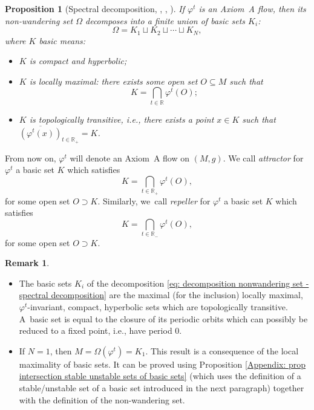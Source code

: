 \documentclass[11pt]{article}
\newcommand{\ie}{i.e.,\xspace}
\newcommand{\skpt}{\smallskip}
\theoremstyle{definition}
\newtheorem{remark}[definition]{Remark}
\theoremstyle{plain}
\newtheorem{prop}[definition]{Proposition}
\newcommand{\R}{\mathbb{R}}
\begin{document}
\begin{prop}[{Spectral decomposition, \cite[\S II.5]{smale}, \cite{bowen2}, \cite[Th.\,5.3.37]{FH}}]
If $\varphi^t$ is an Axiom~A flow, then its non-wandering set $\Omega$ decomposes into a finite union of \emph{basic} sets $K_i$:\vspace*{-3pt}
\begin{equation}\label{eq: decomposition nonwandering set - spectral decomposition}
\Omega = K_1 \sqcup K_2 \sqcup \cdots \sqcup K_N,
\end{equation}
where $K$ basic means:
\begin{itemize}
\item $K$ is compact and hyperbolic;
\item $K$ is locally maximal: there exists some open set $O\subseteq M$ such that\vspace*{-3pt}
\[
K = \bigcap_{t \in \R} \varphi^t (O);
\]
\item $K$ is topologically transitive, \ie there exists a point $x \in K$ such that \\$\overline{(\varphi^t(x))}_{t \in \R_+} = K$.
\end{itemize}
\end{prop}

From now on, $\varphi^t$ will denote an Axiom~A flow on $(M,g)$. We call \textit{attractor} for $\varphi^t$ a basic set $K$ which satisfies\vspace*{-3pt}
\[
K = \bigcap_{t \in \R_+} \varphi^t (O),
\]
for some open set $O \supset K$. Similarly, we~call \textit{repeller} for $\varphi^t$ a basic set $K$ which satisfies\vspace*{-3pt}
\[
K = \bigcap_{t \in \R_-} \varphi^t (O),
\]
for some open set $O \supset K$.

\skpt
\begin{remark}\label{rk: fixed point isolated}
\begin{itemize}
\item The basic sets $K_i$ of the decomposition \eqref{eq: decomposition nonwandering set - spectral decomposition} are the maximal (for the inclusion) locally maximal, $\varphi^t$-invariant, compact, hyperbolic sets which are topologically transitive. A~basic set is equal to the closure of its periodic orbits which can possibly be reduced to a fixed point, \ie have period $0$.
\item If $N = 1$, then $M = \Omega (\varphi^t) = K_1$. This result is a consequence of the local maximality of basic sets. It can be proved using Proposition \ref{Appendix: prop intersection stable unstable sets of basic sets} (which uses the definition of a stable/unstable set of a basic set introduced in the next paragraph) together with the definition of the non-wandering set.
\end{itemize}
\end{remark}
\end{document}
